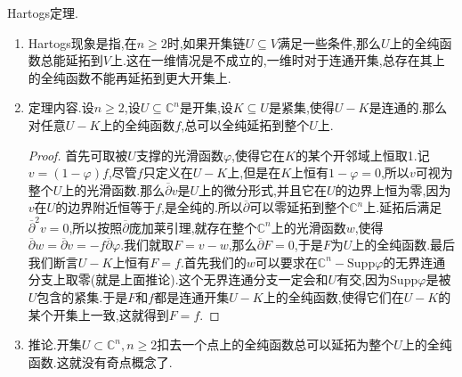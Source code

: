Hartogs定理.
\begin{enumerate}
	\item Hartogs现象是指,在$n\ge2$时,如果开集链$U\subseteq V$满足一些条件,那么$U$上的全纯函数总能延拓到$V$上.这在一维情况是不成立的,一维时对于连通开集,总存在其上的全纯函数不能再延拓到更大开集上.
	\item 定理内容.设$n\ge2$,设$U\subseteq\mathbb{C}^n$是开集,设$K\subseteq U$是紧集,使得$U-K$是连通的.那么对任意$U-K$上的全纯函数$f$,总可以全纯延拓到整个$U$上.
	\begin{proof}
		
		首先可取被$U$支撑的光滑函数$\varphi$,使得它在$K$的某个开邻域上恒取1.记$v=(1-\varphi)f$,尽管$f$只定义在$U-K$上,但是在$K$上恒有$1-\varphi=0$,所以$v$可视为整个$U$上的光滑函数.那么$\overline{\partial}v$是$U$上的微分形式,并且它在$U$的边界上恒为零,因为$v$在$U$的边界附近恒等于$f$,是全纯的.所以$\overline{\partial}$可以零延拓到整个$\mathbb{C}^n$上.延拓后满足$\overline{\partial}^2v=0$,所以按照$\overline{\partial}$庞加莱引理,就存在整个$\mathbb{C}^n$上的光滑函数$w$,使得$\overline{\partial}w=\overline{\partial}v=-f\overline{\partial}\varphi$.我们就取$F=v-w$,那么$\overline{\partial}F=0$,于是$F$为$U$上的全纯函数.最后我们断言$U-K$上恒有$F=f$.首先我们的$w$可以要求在$\mathbb{C}^n-\mathrm{Supp}\varphi$的无界连通分支上取零(就是上面推论).这个无界连通分支一定会和$U$有交,因为$\mathrm{Supp}\varphi$是被$U$包含的紧集.于是$F$和$f$都是连通开集$U-K$上的全纯函数,使得它们在$U-K$的某个开集上一致,这就得到$F=f$.
	\end{proof}
    \item 推论.开集$U\subset\mathbb{C}^n,n\ge2$扣去一个点上的全纯函数总可以延拓为整个$U$上的全纯函数.这就没有奇点概念了.
\end{enumerate}

